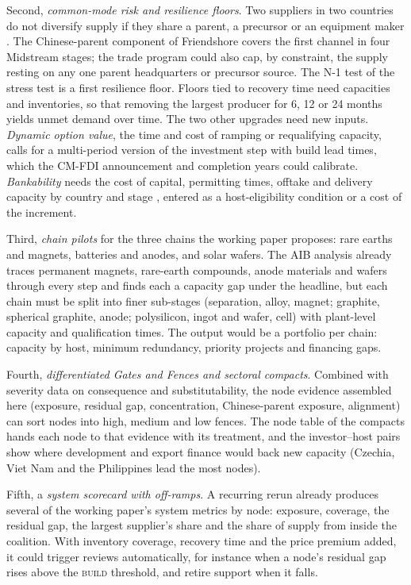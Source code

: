 Second, \emph{common-mode risk and resilience floors}. Two suppliers in two countries do not
diversify supply if they share a parent, a precursor or an equipment maker
\citep{neis2026allied,farrell2019weaponized}. The Chinese-parent component of Friendshore covers
the first channel in four Midstream stages; the trade program could also cap, by constraint, the
supply resting on any one parent headquarters or precursor source. The N-1 test of the stress test is
a first resilience floor. Floors tied to recovery time need capacities and inventories, so that
removing the largest producer for 6, 12 or 24 months yields unmet demand over time. The two other
upgrades need new inputs. \emph{Dynamic option value}, the time and cost of ramping or requalifying
capacity, calls for a multi-period version of the investment step with build lead times, which the
CM-FDI announcement and completion years could calibrate. \emph{Bankability} needs the cost of capital,
permitting times, offtake and delivery capacity by country and stage \citep{spokas2025systemic},
entered as a host-eligibility condition or a cost of the increment.

Third, \emph{chain pilots} for the three chains the working paper proposes: rare earths and magnets,
batteries and anodes, and solar wafers. The AIB analysis already traces permanent magnets, rare-earth
compounds, anode materials and wafers through every step and finds each a capacity gap under the
headline, but each chain must be split into finer sub-stages (separation, alloy, magnet; graphite,
spherical graphite, anode; polysilicon, ingot and wafer, cell) with plant-level capacity and
qualification times. The output would be a portfolio per chain: capacity by host, minimum redundancy,
priority projects and financing gaps.

Fourth, \emph{differentiated Gates and Fences and sectoral compacts}. Combined with severity data
on consequence and substitutability, the node evidence assembled here (exposure, residual gap,
concentration, Chinese-parent exposure, alignment) can sort nodes into high, medium and low fences.
The node table of the compacts hands each node to that evidence with its treatment, and the
investor--host pairs show where development and export finance would back new capacity (Czechia, Viet
Nam and the Philippines lead the most nodes).

Fifth, a \emph{system scorecard with off-ramps}. A recurring rerun already produces several of the
working paper's system metrics by node: exposure, coverage, the residual gap, the largest supplier's
share and the share of supply from inside the coalition. With inventory coverage, recovery time and
the price premium added, it could trigger reviews automatically, for instance when a node's residual
gap rises above the \textsc{build} threshold, and retire support when it falls.

